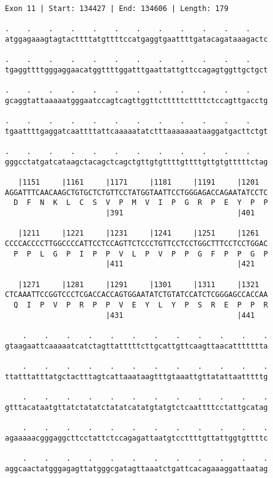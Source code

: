 \documentclass{article}
\begin{document}
\newpage
\begin{Verbatim}[fontfamily=courier]
Exon 11 | Start: 134427 | End: 134606 | Length: 179

.    .    .    .    .    .    .    .    .    .    .    .    
atggagaaagtagtacttttatgttttccatgaggtgaattttgatacagataaagactc

.    .    .    .    .    .    .    .    .    .    .    .    
tgaggttttgggaggaacatggttttggatttgaattattgttccagagtggttgctgct

.    .    .    .    .    .    .    .    .    .    .    .    
gcaggtattaaaaatgggaatccagtcagttggttctttttcttttctccagttgacctg

.    .    .    .    .    .    .    .    .    .    .    .    
tgaattttgaggatcaattttattcaaaaatatctttaaaaaaataaggatgacttctgt

.    .    .    .    .    .    .    .    .    .    .    .    
gggcctatgatcataagctacagctcagctgttgtgttttgttttgttgtgtttttctag

   |1151     |1161     |1171     |1181     |1191     |1201  
AGGATTTCAACAAGCTGTGCTCTGTTCCTATGGTAATTCCTGGGAGACCAGAATATCCTC
  D  F  N  K  L  C  S  V  P  M  V  I  P  G  R  P  E  Y  P  P
                       |391                          |401   

   |1211     |1221     |1231     |1241     |1251     |1261  
CCCCACCCCTTGGCCCCATTCCTCCAGTTCTCCCTGTTCCTCCTGGCTTTCCTCCTGGAC
  P  P  L  G  P  I  P  P  V  L  P  V  P  P  G  F  P  P  G  P
                       |411                          |421   

   |1271     |1281     |1291     |1301     |1311     |1321  
CTCAAATTCCGGTCCCTCGACCACCAGTGGAATATCTGTATCCATCTCGGGAGCCACCAA
  Q  I  P  V  P  R  P  P  V  E  Y  L  Y  P  S  R  E  P  P  R
                       |431                          |441   

    .    .    .    .    .    .    .    .    .    .    .    .
gtaagaattcaaaaatcatctagttatttttcttgcattgttcaagttaacattttttta

    .    .    .    .    .    .    .    .    .    .    .    .
ttatttatttatgctactttagtcattaaataagtttgtaaattgttatattaatttttg

    .    .    .    .    .    .    .    .    .    .    .    .
gtttacataatgttatctatatctatatcatatgtatgtctcaattttcctattgcatag

    .    .    .    .    .    .    .    .    .    .    .    .
agaaaaacgggaggcttcctattctccagagattaatgtccttttgttattggtgttttc

    .    .    .    .    .    .    .    .    .    .    .    .
aggcaactatgggagagttatgggcgatagttaaatctgattcacagaaaggattaatag
\end{Verbatim}
\end{document}
